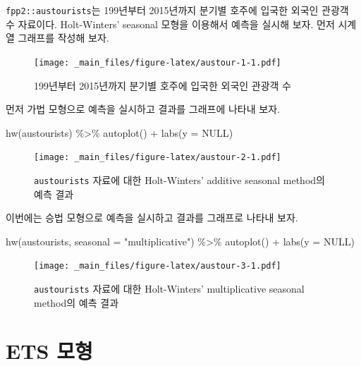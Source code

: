 \documentclass[
]{book}
\newenvironment{Shaded}{\begin{snugshade}}{\end{snugshade}}
\newcommand{\AttributeTok}[1]{\textcolor[rgb]{0.77,0.63,0.00}{#1}}
\newcommand{\ConstantTok}[1]{\textcolor[rgb]{0.00,0.00,0.00}{#1}}
\newcommand{\FunctionTok}[1]{\textcolor[rgb]{0.00,0.00,0.00}{#1}}
\newcommand{\NormalTok}[1]{#1}
\newcommand{\SpecialCharTok}[1]{\textcolor[rgb]{0.00,0.00,0.00}{#1}}
\newcommand{\StringTok}[1]{\textcolor[rgb]{0.31,0.60,0.02}{#1}}
\begin{document}
\texttt{fpp2::austourists}는 199년부터 2015년까지 분기별 호주에 입국한 외국인 관광객 수 자료이다. Holt-Winters' seasonal 모형을 이용해서 예측을 실시해 보자. 먼저 시계열 그래프를 작성해 보자.

\begin{figure}
\centering
\texttt{[image: \_main\_files/figure-latex/austour-1-1.pdf]}
\caption{\label{fig:austour-1}199년부터 2015년까지 분기별 호주에 입국한 외국인 관광객 수}
\end{figure}

먼저 가법 모형으로 예측을 실시하고 결과를 그래프에 나타내 보자.

\begin{Shaded}
\begin{Highlighting}[]
\FunctionTok{hw}\NormalTok{(austourists) }\SpecialCharTok{\%\textgreater{}\%} 
  \FunctionTok{autoplot}\NormalTok{() }\SpecialCharTok{+} \FunctionTok{labs}\NormalTok{(}\AttributeTok{y =} \ConstantTok{NULL}\NormalTok{)}
\end{Highlighting}
\end{Shaded}

\begin{figure}
\centering
\texttt{[image: \_main\_files/figure-latex/austour-2-1.pdf]}
\caption{\label{fig:austour-2}\texttt{austourists} 자료에 대한 Holt-Winters' additive seasonal method의 예측 결과}
\end{figure}

이번에는 승법 모형으로 예측을 실시하고 결과를 그래프로 나타내 보자.

\begin{Shaded}
\begin{Highlighting}[]
\FunctionTok{hw}\NormalTok{(austourists, }\AttributeTok{seasonal =} \StringTok{"multiplicative"}\NormalTok{) }\SpecialCharTok{\%\textgreater{}\%} 
  \FunctionTok{autoplot}\NormalTok{() }\SpecialCharTok{+} \FunctionTok{labs}\NormalTok{(}\AttributeTok{y =} \ConstantTok{NULL}\NormalTok{)}
\end{Highlighting}
\end{Shaded}

\begin{figure}
\centering
\texttt{[image: \_main\_files/figure-latex/austour-3-1.pdf]}
\caption{\label{fig:austour-3}\texttt{austourists} 자료에 대한 Holt-Winters' multiplicative seasonal method의 예측 결과}
\end{figure}

\hypertarget{section-ets}{%
\section{ETS 모형}\label{section-ets}}
\end{document}
